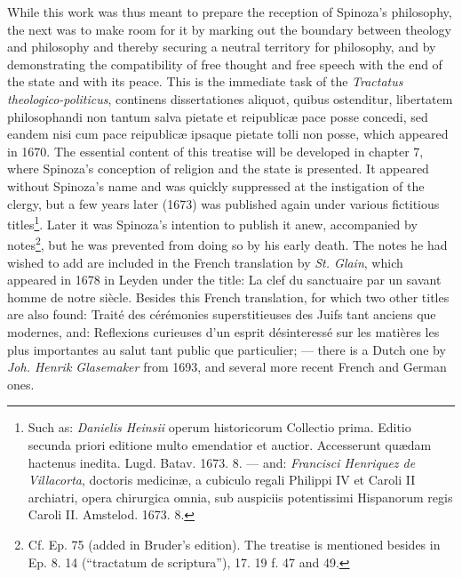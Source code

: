 \documentclass[12pt,a4paper,openany]{book}
\newcommand{\opage}[1]{\marginnote{\footnotesize\textit{[#1]}}}
\begin{document}
While this work was thus meant to prepare the reception of Spinoza's
philosophy, the next was to make room for it by marking out the boundary
between theology and philosophy and thereby securing a neutral territory
for philosophy, and by demonstrating the compatibility of free thought and
free speech with the end of the state and with its peace. This is the
immediate task of the \emph{Tractatus theologico-politicus}, continens
dissertationes aliquot, quibus ostenditur, libertatem philosophandi non
tantum salva pietate et reipublicæ pace posse concedi, sed eandem nisi
cum pace reipublicæ ipsaque pietate tolli non posse, which appeared in
1670. The essential content of this treatise will be developed in
chapter 7, where Spinoza's conception of religion and the state is
presented. It appeared without Spinoza's name and was quickly suppressed
at the instigation of the clergy, but a few years later (1673) was
published again under various fictitious titles\footnote{Such as: %
\emph{Danielis Heinsii} operum historicorum Collectio prima. Editio
secunda priori editione multo emendatior et auctior. Accesserunt quædam
hactenus inedita. Lugd. Batav. 1673. 8. --- and: \emph{Francisci
Henriquez de Villacorta}, doctoris medicinæ, a cubiculo regali Philippi
IV et Caroli II archiatri, opera chirurgica omnia, sub auspiciis
potentissimi Hispanorum regis Caroli II. Amstelod. 1673. 8.}. Later it
was Spinoza's intention
\opage{36}\setcounter{footnote}{0}to publish it anew, accompanied by
notes\footnote{Cf. Ep. 75 (added in Bruder's edition). The treatise is
mentioned besides in Ep. 8. 14 (``tractatum de scriptura''), 17. 19 f. 47
and 49.}, but he was prevented from doing so by his early death. The
notes he had wished to add are included in the French translation by
\emph{St. Glain}, which appeared in 1678 in Leyden under the title: La
clef du sanctuaire par un savant homme de notre siècle. Besides this
French translation, for which two other titles are also found: Traité
des cérémonies superstitieuses des Juifs tant anciens que modernes, and:
Reflexions curieuses d'un esprit désinteressé sur les matières les plus
importantes au salut tant public que particulier; --- there is a Dutch
one by \emph{Joh. Henrik Glasemaker} from 1693, and several more recent
French and German ones.
\end{document}
